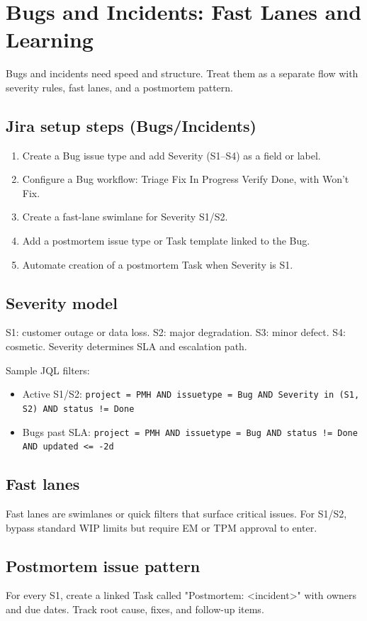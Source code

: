 \section{Bugs and Incidents: Fast Lanes and Learning}
Bugs and incidents need speed and structure. Treat them as a separate flow with severity rules, fast lanes, and a postmortem pattern.

\subsection{Jira setup steps (Bugs/Incidents)}
\begin{enumerate}
  \item Create a Bug issue type and add Severity (S1–S4) as a field or label.
  \item Configure a Bug workflow: Triage \textrightarrow{} Fix In Progress \textrightarrow{} Verify \textrightarrow{} Done, with Won’t Fix.
  \item Create a fast-lane swimlane for Severity S1/S2.
  \item Add a postmortem issue type or Task template linked to the Bug.
  \item Automate creation of a postmortem Task when Severity is S1.
\end{enumerate}

\subsection{Severity model}
S1: customer outage or data loss. S2: major degradation. S3: minor defect. S4: cosmetic. Severity determines SLA and escalation path.

Sample JQL filters:
\begin{itemize}
  \item Active S1/S2: \texttt{project = PMH AND issuetype = Bug AND Severity in (S1, S2) AND status != Done}
  \item Bugs past SLA: \texttt{project = PMH AND issuetype = Bug AND status != Done AND updated <= -2d}
\end{itemize}

\subsection{Fast lanes}
Fast lanes are swimlanes or quick filters that surface critical issues. For S1/S2, bypass standard WIP limits but require EM or TPM approval to enter.

\subsection{Postmortem issue pattern}
For every S1, create a linked Task called "Postmortem: <incident>" with owners and due dates. Track root cause, fixes, and follow-up items.

